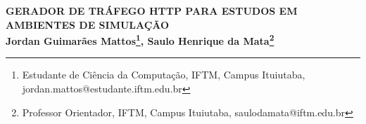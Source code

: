 \begin{center}
\textbf{GERADOR DE TRÁFEGO HTTP PARA ESTUDOS EM AMBIENTES DE SIMULAÇÃO\\
Jordan Guimarães Mattos\footnote[1]{Estudante de Ciência da Computação, IFTM, Campus Ituiutaba, jordan.mattos@estudante.iftm.edu.br}, Saulo Henrique da Mata\footnote[2]{Professor Orientador, IFTM, Campus Ituiutaba, saulodamata@iftm.edu.br}}
\end{center}